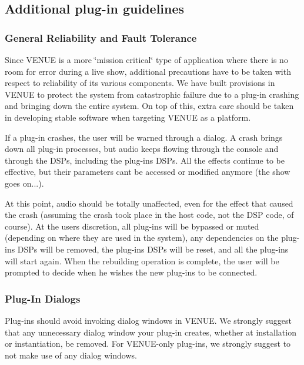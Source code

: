 \hypertarget{a00377_aax_venue_guide__guidelines}{}\subsection{Additional plug-\/in guidelines}\label{a00377_aax_venue_guide__guidelines}
\hypertarget{a00377_subsection__aax_venue_guide__guidelines__reliability}{}\subsubsection{General Reliability and Fault Tolerance}\label{a00377_subsection__aax_venue_guide__guidelines__reliability}
 Since V\+E\+N\+U\+E is a more \char`\"{}mission critical\char`\"{} type of application where there is no room for error during a live show, additional precautions have to be taken with respect to reliability of its various components. We have built provisions in V\+E\+N\+U\+E to protect the system from catastrophic failure due to a plug-\/in crashing and bringing down the entire system. On top of this, extra care should be taken in developing stable software when targeting V\+E\+N\+U\+E as a platform.

 If a plug-\/in crashes, the user will be warned through a dialog. A crash brings down all plug-\/in processes, but audio keeps flowing through the console and through the D\+S\+Ps, including the plug-\/ins\textquotesingle{} D\+S\+Ps. All the effects continue to be effective, but their parameters can\textquotesingle{}t be accessed or modified anymore (the show goes on...).

 At this point, audio should be totally unaffected, even for the effect that caused the crash (assuming the crash took place in the host code, not the D\+S\+P code, of course). At the user\textquotesingle{}s discretion, all plug-\/ins will be bypassed or muted (depending on where they are used in the system), any dependencies on the plug-\/ ins\textquotesingle{} D\+S\+Ps will be removed, the plug-\/ins\textquotesingle{} D\+S\+Ps will be reset, and all the plug-\/ins will start again. When the rebuilding operation is complete, the user will be prompted to decide when he wishes the new plug-\/ins to be connected.

\hypertarget{a00377_subsection__aax_venue_guide__guidelines__dialogs}{}\subsubsection{Plug-\/\+In Dialogs}\label{a00377_subsection__aax_venue_guide__guidelines__dialogs}
 Plug-\/ins should avoid invoking dialog windows in V\+E\+N\+U\+E. We strongly suggest that any unnecessary dialog window your plug-\/in creates, whether at installation or instantiation, be removed. For V\+E\+N\+U\+E-\/only plug-\/ins, we strongly suggest to not make use of any dialog windows.

